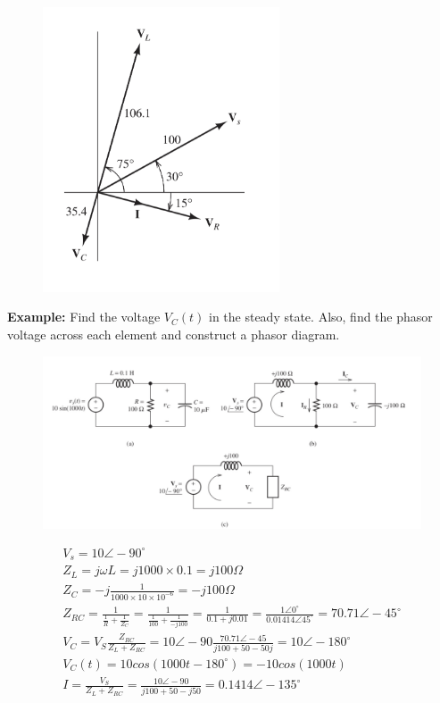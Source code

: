 \documentclass[a4paper,12]{article}
\begin{document}
    \begin{figure}[H]
        \centering
        \includegraphics[width=70mm]{Image/27.jpeg}
    \end{figure}
    \cleardoublepage
     \textbf{Example: }Find the voltage $V_C(t)$ in the steady state. Also, find the phasor voltage across each element and construct a phasor diagram.
     \begin{figure}[H]
         \centering
         \includegraphics[width=170mm]{Image/28.jpeg}
     \end{figure}
     \begin{gather}
         V_s=10\angle-90^\circ\\
         Z_L=j\omega L=j1000\times 0.1=j100\Omega\\
         Z_C=-j\frac{1}{1000\times 10\times 10^{-6}}=-j100\Omega\\
         Z_{RC}=\frac{1}{\frac{1}{R}+\frac{1}{Z_C}}=\frac{1}{\frac{1}{100}+\frac{1}{-j100}}=\frac{1}{0.1+j0.01}=\frac{1\angle 0^\circ}{0.01414\angle45^\circ}=70.71\angle -45^\circ\\
         V_C=V_S\frac{Z_{RC}}{Z_L+Z_{RC}}=10\angle-90\frac{70.71\angle-45}{j100+50-50j}=10\angle-180^\circ\\
         V_C(t)=10cos(1000t-180^\circ)=-10cos(1000t)\\
         I=\frac{V_S}{Z_L+Z_{RC}}=\frac{10\angle-90}{j100+50-j50}=0.1414\angle-135^\circ
     \end{gather}
\end{document}
